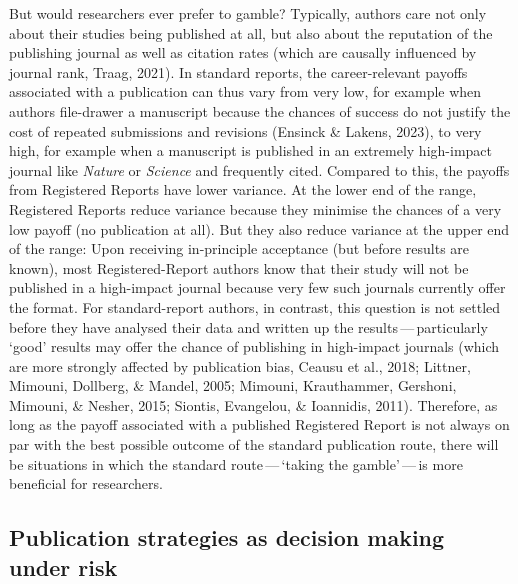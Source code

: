 \documentclass[
  ,man,mask,floatsintext]{apa6}
\begin{document}
But would researchers ever prefer to gamble?
Typically, authors care not only about their studies being published at all, but also about the reputation of the publishing journal as well as citation rates (which are causally influenced by journal rank, Traag, 2021).
In standard reports, the career-relevant payoffs associated with a publication can thus vary from very low, for example when authors file-drawer a manuscript because the chances of success do not justify the cost of repeated submissions and revisions (Ensinck \& Lakens, 2023),
to very high, for example when a manuscript is published in an extremely high-impact journal like \emph{Nature} or \emph{Science} and frequently cited.
Compared to this, the payoffs from Registered Reports have lower variance.
At the lower end of the range, Registered Reports reduce variance because they minimise the chances of a very low payoff (no publication at all).
But they also reduce variance at the upper end of the range:
Upon receiving in-principle acceptance (but before results are known), most Registered-Report authors know that their study will not be published in a high-impact journal because very few such journals currently offer the format.
For standard-report authors, in contrast, this question is not settled before they have analysed their data and written up the results\(\,\)---\(\,\)particularly `good' results may offer the chance of publishing in high-impact journals (which are more strongly affected by publication bias, Ceausu et al., 2018; Littner, Mimouni, Dollberg, \& Mandel, 2005; Mimouni, Krauthammer, Gershoni, Mimouni, \& Nesher, 2015; Siontis, Evangelou, \& Ioannidis, 2011).
Therefore, as long as the payoff associated with a published Registered Report is not always on par with the best possible outcome of the standard publication route,
there will be situations in which the standard route\(\,\)---\(\,\)`taking the gamble'\(\,\)---\(\,\)is more beneficial for researchers.

\hypertarget{publication-strategies-as-decision-making-under-risk}{%
\subsection{Publication strategies as decision making under risk}\label{publication-strategies-as-decision-making-under-risk}}
\end{document}

